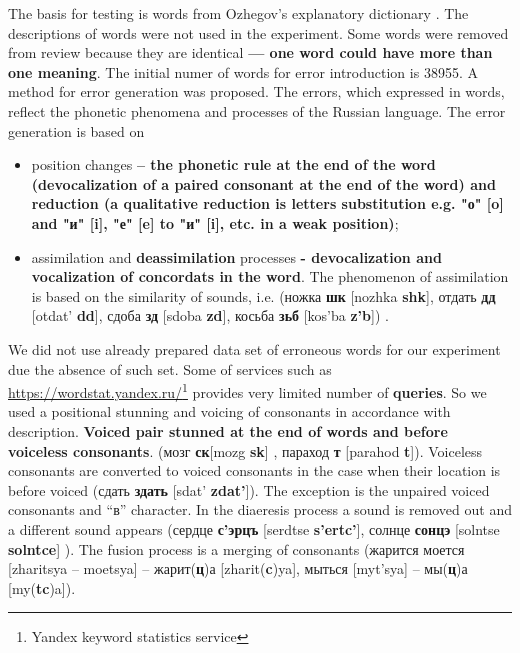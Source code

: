 \documentclass{svproc}
\begin{document}
The basis for testing is words from Ozhegov’s explanatory dictionary \cite{Ozhegov-2007}. The descriptions of words were not used in the experiment. Some words were removed from review because they are identical\textbf{ --- one word could have more than one meaning}. The initial numer of words for error introduction is 38955.
A method for error generation was proposed. The errors, which expressed in words, reflect the phonetic phenomena and processes of the Russian language. The error generation is based on
\begin{itemize}
\item position changes \textbf{– the phonetic rule at the end of the word (devocalization of a paired consonant at the end of the word) and reduction (a qualitative reduction is letters substitution e.g. "о" \textbf{[o]} and "и" \textbf{[i]}, "е" \textbf{[e]} to "и" \textbf{[i]}, etc. in a weak position)};
\item assimilation and \textbf{deassimilation} processes \textbf{- devocalization and vocalization of concordats in the word}. The phenomenon of assimilation is based on the similarity of sounds, i.e. (ножка {\textbf{шк}} [nozhka {\textbf{shk}}], отдать {\textbf{дд}} [otdat’ {\textbf{dd}}], сдоба {\textbf{зд}} [sdoba {\textbf{zd}}], косьба {\textbf{зьб}} [kos’ba {\textbf{z’b}}]) \cite{Kastkin-1999}.
\end{itemize}

We did not use already prepared data set of erroneous words for our experiment due the absence of such set. Some of services such as \url{https://wordstat.yandex.ru/}\footnote[1]{Yandex keyword statistics service} provides very limited number of \textbf{queries}.
So we used a positional stunning and voicing of consonants in accordance with \cite{Skripnik-2010,Kastkin-1999} description. \textbf{Voiced pair stunned at the end of words and before voiceless consonants}. (мозг {\textbf{ск}}[mozg {\textbf{sk}}] , параход {\textbf{т}} [parahod {\textbf{t}}]). Voiceless consonants are converted to voiced consonants in the case when their location is before voiced (сдать {\textbf{здать}} [sdat’ {\textbf{zdat’}}]). The exception is the unpaired voiced consonants and “в” character. In the diaeresis process a sound is removed out and a different sound appears (сердце {\textbf{с'эрцъ}} [serdtse {\textbf{s’ertc’}}], солнце {\textbf{сонцэ}} [solntse {\textbf{solntce}}] ). The fusion process is a merging of consonants (жарится моется [zharitsya – moetsya] – жарит(\textbf{ц})а [zharit(\textbf{c})ya], мыться [myt’sya] – мы(\textbf{ц})а [my(\textbf{tc})a]).
\end{document}
